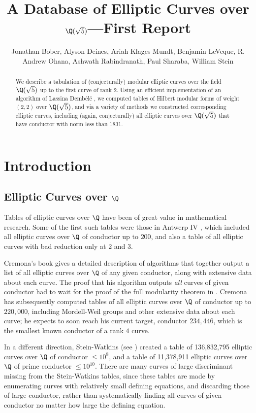 \documentclass{amsart}
\title{A Database of Elliptic Curves over $\Q(\sqrt{5})$---First Report}
\author[Bober et al.]{Jonathan Bober, Alyson Deines, Ariah Klages-Mundt, Benjamin
  LeVeque, R. Andrew Ohana, Ashwath Rabindranath, Paul Sharaba, William
  Stein}
\newcommand{\dembele}{Demb\'el{\'e}\xspace}
\begin{document}
\begin{abstract} 
  We describe a tabulation of (conjecturally) modular elliptic curves
  over the field $\Q(\sqrt5)$ up to the first curve of rank $2$. Using
  an efficient implementation of an algorithm of Lassina \dembele
  \cite{dembele:hilbert5}, we computed tables of Hilbert modular
  forms of weight $(2,2)$ over $\Q(\sqrt 5)$, and via a variety of
  methods we constructed corresponding elliptic curves, including
  (again, conjecturally) all elliptic curves over $\Q(\sqrt5)$ that
  have conductor with norm less than 1831.
\end{abstract} 

\maketitle

\section{Introduction}\label{sec:intro}

\subsection{Elliptic Curves over $\Q$}
Tables of elliptic curves over $\Q$ have been of great value in
mathematical research.  Some of the first such tables were those in
Antwerp IV \cite{antwerpiv}, which included all elliptic curves over
$\Q$ of conductor up to $200$, and also a table of all elliptic curves
with bad reduction only at $2$ and $3$.  

Cremona's book \cite{cremona:algs} gives a detailed description of
algorithms that together output a list of all elliptic curves over
$\Q$ of any given conductor, along with extensive data about each
curve.  The proof that his algorithm outputs {\em all} curves of given
conductor had to wait for the proof of the full modularity theorem in
\cite{breuil-conrad-diamond-taylor}.  Cremona has subsequently
computed tables \cite{cremona:onlinetables} of all elliptic curves
over $\Q$ of conductor up to $220,\!000$, including Mordell-Weil
groups and other extensive data about each curve; he expects to soon
reach his current target, conductor $234,\!446$, which is the smallest
known conductor of a rank $4$ curve.

In a different direction, Stein-Watkins (see \cite{stein-watkins:ants5, bmsw:bulletins}) 
created a table of 136,832,795 elliptic curves over $\Q$ of conductor $\leq 10^8$, and a
table of 11,378,911 elliptic curves over $\Q$ of prime conductor $\leq
10^{10}$. 
There are many curves of large discriminant missing from the
Stein-Watkins tables, since these tables are made by enumerating
curves with relatively small defining equations, and discarding those
of large conductor, rather than systematically finding all curves of
given conductor no matter how large the defining equation.
\end{document}

